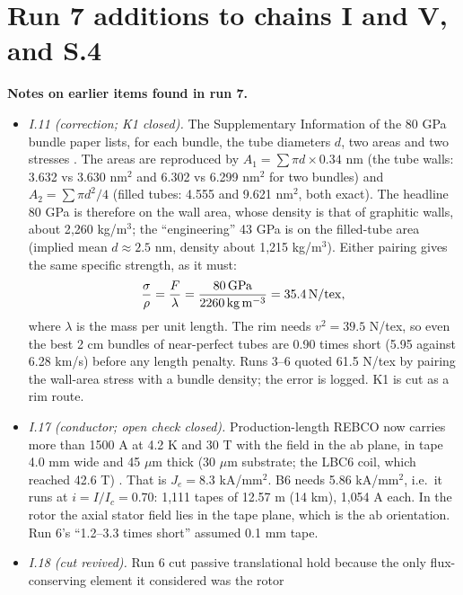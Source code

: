 \section*{Run 7 additions to chains I and V, and S.4}
\noindent\textbf{Notes on earlier items found in run 7.}
\begin{itemize}
\item \emph{I.11 (correction; K1 closed).} The Supplementary Information of the 80 GPa bundle paper lists, for each bundle, the tube diameters
$d$, two areas and two stresses \cite{bai18si}. The areas are reproduced by $A_1=\sum\pi d\times0.34$ nm (the tube walls: 3.632 vs 3.630 nm$^2$
and 6.302 vs 6.299 nm$^2$ for two bundles) and $A_2=\sum\pi d^2/4$ (filled tubes: 4.555 and 9.621 nm$^2$, both exact). The headline 80 GPa is
therefore on the wall area, whose density is that of graphitic walls, about 2{,}260 kg/m$^3$; the ``engineering'' 43 GPa is on the filled-tube
area (implied mean $d\approx2.5$ nm, density about 1{,}215 kg/m$^3$). Either pairing gives the same specific strength, as it must:
\[
\frac{\sigma}{\rho}=\frac{F}{\lambda}=\frac{80\,\mathrm{GPa}}{2260\,\mathrm{kg\,m^{-3}}}=35.4\,\mathrm{N/tex},
\]
where $\lambda$ is the mass per unit length. The rim needs $v^2=39.5$ N/tex, so even the best 2 cm bundles of near-perfect tubes are 0.90 times
short (5.95 against 6.28 km/s) before any length penalty. Runs 3--6 quoted 61.5 N/tex by pairing the wall-area stress with a bundle density; the
error is logged. K1 is cut as a rim route.
\item \emph{I.17 (conductor; open check closed).} Production-length REBCO now carries more than 1500 A at 4.2 K and 30 T with the field in the
ab plane, in tape 4.0 mm wide and 45 $\mu$m thick (30 $\mu$m substrate; the LBC6 coil, which reached 42.6 T) \cite{lbc6}. That is
$J_e=8.3$ kA/mm$^2$. B6 needs 5.86 kA/mm$^2$, i.e.\ it runs at $i=I/I_c=0.70$: 1{,}111 tapes of 12.57 m (14 km), 1{,}054 A each. In the rotor the
axial stator field lies in the tape plane, which is the ab orientation. Run 6's ``1.2--3.3 times short'' assumed 0.1 mm tape.
\item \emph{I.18 (cut revived).} Run 6 cut passive translational hold because the only flux-conserving element it considered was the rotor

\end{itemize}
